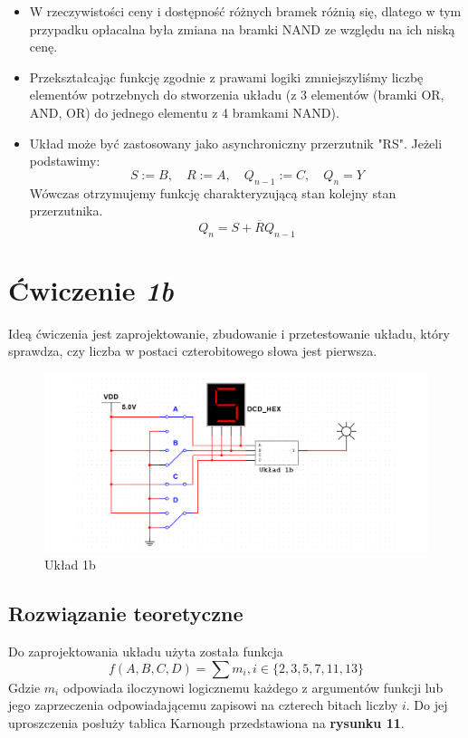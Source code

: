 \documentclass{article}
\begin{document}
\begin{itemize}
    \item
    W rzeczywistości ceny i dostępność różnych bramek różnią się, dlatego w tym przypadku opłacalna była zmiana na bramki NAND 
    ze względu na ich niską cenę.
    \item
    Przekształcając funkcję zgodnie z prawami logiki zmniejszyliśmy liczbę elementów potrzebnych do stworzenia układu 
    (z 3 elementów (bramki OR, AND, OR) do jednego elementu z 4 bramkami NAND).
    \item
    Układ może być zastosowany jako asynchroniczny przerzutnik "RS". Jeżeli podstawimy:
    \[S:=B, \quad R:=A, \quad Q_{n-1}:=C, \quad Q_n=Y\]
    Wówczas otrzymujemy funkcję charakteryzującą stan kolejny stan przerzutnika.
    \[Q_n=S+\overline{R}Q_{n-1}\]
    
\end{itemize}



\section{Ćwiczenie \textit{1b}}
Ideą ćwiczenia jest zaprojektowanie, zbudowanie i przetestowanie układu, który sprawdza, czy liczba w postaci czterobitowego słowa jest pierwsza. 

\begin{figure}[H]
    \centering
    \includegraphics[width=\textwidth]{idea_2.png}
    \caption{Układ 1b}
\end{figure}

\subsection{Rozwiązanie teoretyczne}
Do zaprojektowania układu użyta została funkcja
    \[f(A,B,C,D)=\sum{m_i}, i\in\{2,3,5,7,11,13\}\]
Gdzie $m_i$ odpowiada iloczynowi logicznemu każdego z argumentów funkcji lub jego zaprzeczenia 
odpowiadającemu zapisowi na czterech bitach liczby $i$.
Do jej uproszczenia posłuży tablica Karnough przedstawiona na \textbf{rysunku 11}.
\end{document}
